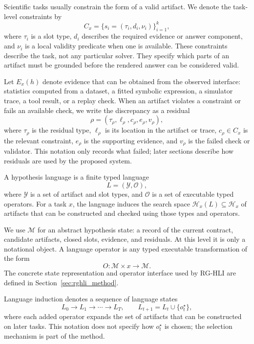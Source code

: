 \documentclass[letterpaper]{article}
\newcommand{\methodshort}{\textsc{RG-HLI}\xspace}
\begin{document}
Scientific tasks usually constrain the form of a valid artifact. We denote the
task-level constraints by
\begin{equation}
  C_x=\{s_i=(\tau_i,d_i,\nu_i)\}_{i=1}^{k},
\end{equation}
where $\tau_i$ is a slot type, $d_i$ describes the required evidence or answer
component, and $\nu_i$ is a local validity predicate when one is available.
These constraints describe the task, not any particular solver. They specify
which parts of an artifact must be grounded before the rendered answer can be
considered valid.

Let $E_x(h)$ denote evidence that can be obtained from the observed interface:
statistics computed from a dataset, a fitted symbolic expression, a simulator
trace, a tool result, or a replay check. When an artifact violates a constraint
or fails an available check, we write the discrepancy as a residual
\begin{equation}
  \rho=(\tau_\rho,\ell_\rho,c_\rho,e_\rho,v_\rho),
\end{equation}
where $\tau_\rho$ is the residual type, $\ell_\rho$ is its location in the
artifact or trace, $c_\rho\in C_x$ is the relevant constraint, $e_\rho$ is the
supporting evidence, and $v_\rho$ is the failed check or validator. This
notation only records what failed; later sections describe how residuals are
used by the proposed system.

A hypothesis language is a finite typed language
\begin{equation}
  L=(\mathcal{Y},\mathcal{O}),
\end{equation}
where $\mathcal{Y}$ is a set of artifact and slot types, and $\mathcal{O}$ is a
set of executable typed operators. For a task $x$, the language induces the
search space $\mathcal{H}_x(L)\subseteq\mathcal{H}_x$ of artifacts that can be
constructed and checked using those types and operators.

We use $\mathcal{M}$ for an abstract hypothesis state: a record of the current
contract, candidate artifacts, closed slots, evidence, and residuals. At this
level it is only a notational object. A language operator is any typed
executable transformation of the form
\begin{equation}
  O:\mathcal{M}\times x \rightarrow \mathcal{M}.
\end{equation}
The concrete state representation and operator interface used by \methodshort
are defined in Section~\ref{sec:rghli_method}.

Language induction denotes a sequence of language states
\begin{equation}
  L_0\rightarrow L_1\rightarrow\cdots\rightarrow L_T,
  \qquad
  L_{t+1}=L_t\cup\{o_t^\star\},
\end{equation}
where each added operator expands the set of artifacts that can be constructed
on later tasks. This notation does not specify how $o_t^\star$ is chosen; the
selection mechanism is part of the method.
\end{document}
